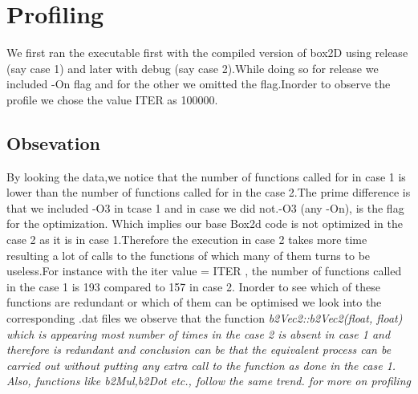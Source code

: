 \documentclass[11pt]{article}
\begin{document}
\section{Profiling}
We first ran the executable first with the compiled version of box2D using release (say case 1) and later with debug (say case 2).While doing so for release we included -On flag and for the other we omitted the flag.Inorder to observe the profile we chose the value ITER as 100000.
\subsection{Obsevation}
By looking the data,we notice that the number of functions called for in case 1 is lower than the number of functions called for in the case 2.The prime difference is that we included -O3 in tcase 1 and in case we did not.-O3 (any -On), is the flag for the optimization.\newline
Which implies our base Box2d code is not optimized in the case 2 as it is in case 1.Therefore the execution in case 2 takes more time resulting a lot of calls to the functions of which many of them turns to be useless.For instance with the iter value = ITER , the number of functions called in the case 1 is 193 compared to 157 in case 2.\newline
Inorder to see which of these functions are redundant or which of them can be optimised we look into the corresponding .dat files\newline
we observe that the function \it b2Vec2::b2Vec2(float, float) \rm which is appearing most number of times in the case 2 is absent in case 1 and therefore is redundant and conclusion can be that the equivalent process can be carried out without putting any extra call to the function as done in the case 1.\newline
Also, functions like b2Mul,b2Dot etc., follow the same trend.
for more on profiling \cite{gprof}
\end{document}
